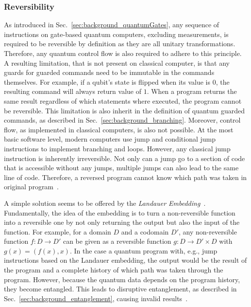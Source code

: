 \subsubsection{Reversibility}
\label{sec:background_controlflow_reversibility}
As introduced in Sec.~\ref{sec:background_quantumGates}, any sequence of instructions on gate-based quantum computers, excluding measurements, is required to be reversible by definition as they are all unitary transformations. Therefore, any quantum control flow is also required to adhere to this principle. A resulting limitation, that is not present on classical computer, is that any guards for guarded commands need to be immutable in the commands themselves. For example, if a qubit's state is flipped when its value is $0$, the resulting command will always return value of $1$. When a program returns the same result regardless of which statements where executed, the program cannot be reversible. This limitation is also inherit in the definition of quantum guarded commands, as described in Sec.~\ref{sec:background_branching}.
Moreover, control flow, as implemented in classical computers, is also not possible. At the most basic software level, modern computers use jump and conditional jump instructions to implement branching and loops. However, any classical jump instruction is inherently irreversible. Not only can a jump go to a section of code that is accessible without any jumps, multiple jumps can also lead to the same line of code. Therefore, a reversed program cannot know which path was taken in original program~\cite{YVC24}.  

A simple solution seems to be offered by the \emph{Landauer Embedding}~\cite{Land61}. Fundamentally, the idea of the embedding is to turn a non-reversible function into a reversible one by not only returning the output but also the input of the function. For example, for a domain $D$ and a codomain $D'$, any non-reversible function $f : D \to D'$ can be given as a reversible function $g : D \to D' \times D$ with $g(x) = (f(x), x)$. In the case a quantum program with, e.g., jump instructions based on the Landauer embedding, the output would be the result of the program and a complete history of which path was taken through the program. However, because the quantum data depends on the program history, they become entangled. This leads to disruptive entanglement, as described in Sec.~\ref{sec:background_entanglement}, causing invalid results~\cite{YVC24}. 


